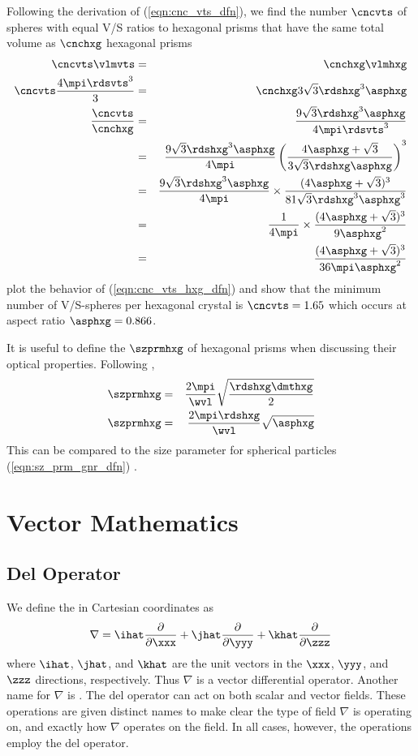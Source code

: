 \documentclass[12pt,twoside]{book}
\begin{document}
Following the derivation of (\ref{eqn:cnc_vts_dfn}), we find the
number $\cncvts$ of spheres with equal V/S ratios to hexagonal prisms  
that have the same total volume as $\cnchxg$ hexagonal prisms  
\begin{eqnarray}
\cncvts \vlmvts & = & \cnchxg \vlmhxg \\
\cncvts \frac{4\mpi\rdsvts^{3}}{3} & = & 
\cnchxg 3\sqrt{3}\rdshxg^{3}\asphxg \nonumber \\
\frac{\cncvts}{\cnchxg} & = & 
\frac{9\sqrt{3}\rdshxg^{3}\asphxg}{4\mpi\rdsvts^{3}} \nonumber \\
& = & 
\frac{9\sqrt{3}\rdshxg^{3}\asphxg}{4\mpi} 
\left( \frac{4\asphxg+\sqrt{3}}{3\sqrt{3}\rdshxg\asphxg} \right)^{3} \nonumber \\
& = & 
\frac{9\sqrt{3}\rdshxg^{3}\asphxg}{4\mpi} \times
\frac{(4\asphxg+\sqrt{3})^{3}}{81\sqrt{3}\rdshxg^{3}\asphxg^{3}} \nonumber \\
& = & 
\frac{1}{4\mpi} \times
\frac{(4\asphxg+\sqrt{3})^{3}}{9\asphxg^{2}} \nonumber \\
& = & 
\frac{(4\asphxg+\sqrt{3})^{3}}{36\mpi\asphxg^{2}}
\label{eqn:cnc_vts_hxg_dfn}
\end{eqnarray}
\cite{NGW03} plot the behavior of (\ref{eqn:cnc_vts_hxg_dfn}) and show
that the minimum number of V/S-spheres per hexagonal crystal is
$\cncvts = 1.65$ which occurs at aspect ratio $\asphxg = 0.866$.

It is useful to define the  $\szprmhxg$ of
hexagonal prisms when discussing their optical properties. 
Following \cite{NGW03},
\begin{eqnarray}
\szprmhxg & = & \frac{2\mpi}{\wvl} \sqrt{\frac{\rdshxg\dmthxg}{2}} \nonumber \\
\szprmhxg & = & \frac{2\mpi\rdshxg}{\wvl} \sqrt{\asphxg}
\label{eqn:sz_prm_hxg_dfn}
\end{eqnarray}
This can be compared to the size parameter for spherical particles
(\ref{eqn:sz_prm_gnr_dfn}) .

\section{Vector Mathematics}\label{sxn:vec_mth}
\subsection[Del Operator]{Del Operator}\label{sxn:del_crt}
We define the  in Cartesian coordinates as 
\begin{equation}
\nabla = \ihat \frac{\partial}{\partial \xxx} + 
\jhat \frac{\partial}{\partial \yyy} + 
\khat \frac{\partial}{\partial \zzz}
\label{eqn:del_crt}
\end{equation}
where $\ihat$, $\jhat$, and $\khat$ are the unit vectors in the
$\xxx$, $\yyy$, and $\zzz$ directions, respectively.
Thus $\nabla$ is a vector differential operator.
Another name for $\nabla$ is .
The del operator can act on both scalar and vector fields.
These operations are given distinct names to make clear the type of
field $\nabla$ is operating on, and exactly how $\nabla$ operates on
the field.
In all cases, however, the operations employ the del operator.
\end{document}

